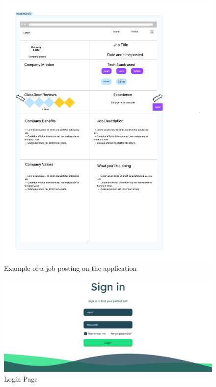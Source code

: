 \begin{figure}
    \noindent
    \centering
    \includegraphics[width = 140mm]{Figures/posting.pdf}
    \decoRule
    \caption[Example of a job posting on the application]{Example of a job posting on the application}
    \label{fig: Job Posting}
\end{figure}

\begin{figure}
    \noindent
    \centering
    \includegraphics[width = 140mm]{Figures/loginPage.pdf}
    \decoRule
    \caption[Login Page]{Login Page}
    \label{fig: Login Page}
\end{figure}


